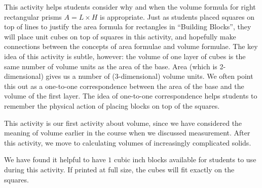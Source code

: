\documentclass{ximera}
\begin{document}
\begin{instructorNotes}
This activity helps students consider why and when the volume formula for right rectangular prisms $A = L \times H$ is appropriate.  Just as students placed squares on top of lines to justify the area formula for rectangles in ``Building Blocks'', they will place unit cubes on top of squares in this activity, and hopefully make connections between the concepts of area formulae and volume formulae.  The key idea of this activity is subtle, however:  the volume of one layer of cubes is the same number of volume units as the area of the base.  Area (which is 2-dimensional) gives us a number of (3-dimensional) volume units.  We often point this out as a one-to-one correspondence between the area of the base and the volume of the first layer.  The idea of one-to-one correspondence helps students to remember the physical action of placing blocks on top of the squares.  


This activity is our first activity about volume, since we have considered the meaning of volume earlier in the course when we discussed measurement.  After this activity, we move to calculating volumes of increasingly complicated solids.

We have found it helpful to have $1$ cubic inch blocks available for students to use during this activity.  If printed at full size, the cubes will fit exactly on the squares.




\end{instructorNotes}
\end{document}
